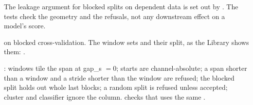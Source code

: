 The leakage argument for blocked splits on dependent data is set out by
\citet{roberts2017cross}. The tests check the geometry and the refusals, not any
downstream effect on a model's score.

\citet{roberts2017cross} on blocked cross-validation. The window sets and their split, as the
Library shows them: .

: windows tile the span at gap\_s $= 0$; starts
are channel-absolute; a span shorter than a window and a stride shorter than the window are
refused; the blocked split holds out whole last blocks; a random split is refused unless
accepted; cluster and classifier ignore the  column.
 checks that 
uses the same .
